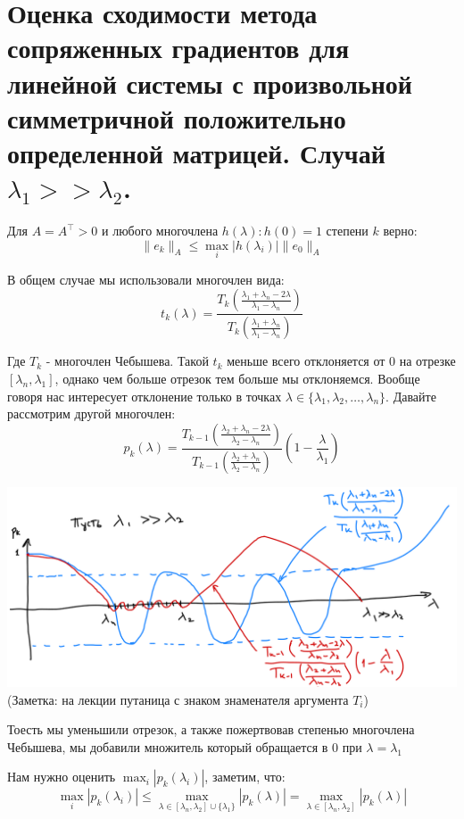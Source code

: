 \section{Оценка сходимости метода сопряженных градиентов для линейной системы с произвольной симметричной положительно определенной матрицей. Случай $\lambda_1 >> \lambda_2$.}

\begin{proposal}
	Для $A = A^\top > 0$ и любого многочлена $h(\lambda): h(0) = 1$ степени $k$ верно:
	$$\|e_k\|_A \le \max_i |h(\lambda_i)|\|e_0\|_A$$
\end{proposal}

В общем случае мы использовали многочлен вида:
$$t_k(\lambda) = \frac{T_k\left(\frac{\lambda_1 + \lambda_n - 2 \lambda}{\lambda_1-\lambda_n}\right)}{T_k\left(\frac{\lambda_1 + \lambda_n}{\lambda_1-\lambda_n}\right)}$$

Где $T_k$ - многочлен Чебышева. Такой $t_k$ меньше всего отклоняется от 0 на отрезке $[\lambda_n, \lambda_1]$, однако чем больше отрезок тем больше мы отклоняемся. Вообще говоря нас интересует отклонение только в точках $\lambda \in \{\lambda_1, \lambda_2, \dots, \lambda_n\}$. Давайте рассмотрим другой многочлен:
$$p_k(\lambda) = \frac{T_{k-1}\left(\frac{\lambda_2 + \lambda_n - 2 \lambda}{\lambda_2-\lambda_n}\right)}{T_{k-1}\left(\frac{\lambda_2 + \lambda_n}{\lambda_2-\lambda_n}\right)}\left(1-\frac{\lambda}{\lambda_1}\right)$$


\begin{center}
	\includegraphics[scale=0.3]{img/q5_1} \\
	(Заметка: на лекции путаница с знаком знаменателя аргумента $T_{i}$)
\end{center}

Тоесть мы уменьшили отрезок, а также пожертвовав степенью многочлена Чебышева, мы добавили множитель который обращается в 0 при $\lambda = \lambda_1$

Нам нужно оценить $\max_i |p_k(\lambda_i)|$, заметим, что:
$$\max_i |p_k(\lambda_i)| \le \max_{\lambda \in [\lambda_{n}, \lambda_2]\cup \{\lambda_1\}}|p_k(\lambda)| = \max_{\lambda \in [\lambda_{n}, \lambda_2]}|p_k(\lambda)|$$

